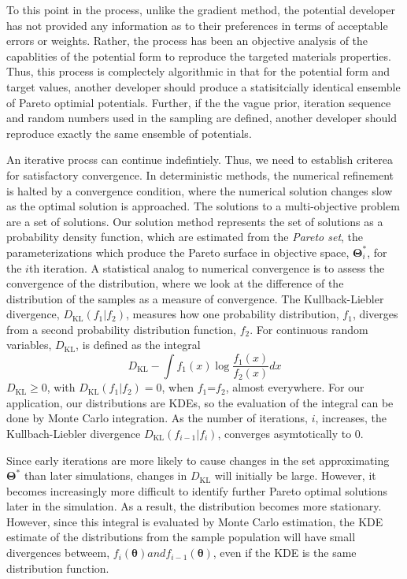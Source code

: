 To this point in the process, unlike the gradient method, the potential developer has not provided any information as to their preferences in terms of acceptable errors or weights. Rather, the process has been an objective analysis of the capablities of the potential form to reproduce the targeted materials properties.  Thus, this process is complectely algorithmic in that for the potential form and target values, another developer should produce a statisitcially identical ensemble of Pareto optimial potentials. Further, if the the vague prior, iteration sequence and random numbers used in the sampling are defined, another developer should reproduce exactly the same ensemble of potentials.

An iterative procss can continue indefintiely. Thus, we need to establish criterea for satisfactory convergence. In deterministic methods, the numerical refinement is halted by a convergence condition, where the numerical solution changes slow as the optimal solution is approached.  The solutions to a multi-objective problem are a set of solutions.  Our solution method represents the set of solutions as a probability density function, which are estimated from the \emph{Pareto set}, the parameterizations which produce the Pareto surface in objective space, $\bm{\Theta}_i^*$, for the $i$th iteration.  A statistical analog to numerical convergence is to assess the convergence of the distribution, where we look at the difference of the distribution of the samples as a measure of convergence. The Kullback-Liebler\cite{kullback1951_kld} divergence, $D_{\text{KL}}(f_1 \vert f_2)$, measures how one probability distribution, $f_1$, diverges from a second probability distribution function, $f_2$.  For continuous random variables, $D_{\text{KL}}$, is defined as the integral
\begin{equation}\label{eq:kld}
    D_{\text{KL}} - \int f_1(x) \log \frac{f_1(x)}{f_2(x)} dx
\end{equation}
$D_{\text{KL}} \geq 0$, with $D_{\text{KL}} (f_1 \vert f_2 )=0$, when $f_1$=$f_2$, almost everywhere.  For our application, our distributions are KDEs, so the evaluation of the integral can be done by Monte Carlo integration\cite{hershey_kld_mc_integration}.  As the number of iterations, $i$, increases, the Kullbach-Liebler divergence $D_{\text{KL}}(f_{i-1}\vert f_i )$, converges asymtotically to $0$.

Since early iterations are more likely to cause changes in the set approximating $\bm{\Theta}^*$ than later simulations, changes in $D_{\text{KL}}$ will initially be large.  However, it becomes increasingly more difficult to identify further Pareto optimal solutions later in the simulation.  As a result, the distribution becomes more stationary.  However, since this integral is evaluated by Monte Carlo estimation, the KDE estimate of the distributions from the sample population will have small divergences betweem, $f_i(\bm{\theta}) and f_{i-1}(\bm{\theta})$, even if the KDE is the same distribution function.

